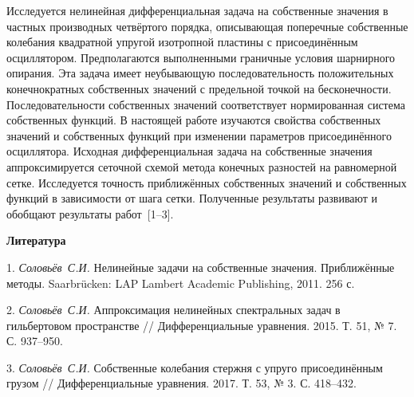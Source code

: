 \vzmscaption


Исследуется нелинейная дифференциальная задача на собственные значения в частных производных четвёртого порядка,
описывающая поперечные собственные колебания квадратной упругой изотропной пластины с присоединённым осциллятором.
Предполагаются выполненными граничные условия шарнирного опирания.
Эта задача имеет неубывающую последовательность положительных конечнократных собственных значений
с предельной точкой на бесконечности.
Последовательности собственных значений соответствует нормированная система
собственных функций.
В настоящей работе изучаются свойства собственных значений и собственных функций
при изменении параметров присоединённого осциллятора.
Исходная дифференциальная задача на собственные значения аппроксимируется
сеточной схемой метода конечных разностей на равномерной сетке.
Исследуется точность приближённых собственных значений
и собственных функций в зависимости от шага сетки.
Полученные результаты развивают и обобщают результаты работ~[1--3].



\smallskip \centerline {\bf Литература} \nopagebreak

1. {\it Соловьёв~С.И.}
Нелинейные задачи на собственные значения. Приближённые методы.
Saarbr\"ucken: LAP Lambert Academic Publishing, 2011. 256 с.

2. {\it Соловьёв~С.И.}
Аппроксимация нелинейных спектральных задач в гильбертовом пространстве
// Дифференциальные уравнения. 2015. Т. 51,
№ 7. С. 937--950.

3. {\it Соловьёв~С.И.}
Собственные колебания стержня с упруго присоединённым грузом
// Дифференциальные уравнения. 2017. Т. 53,
№ 3. С. 418--432.
